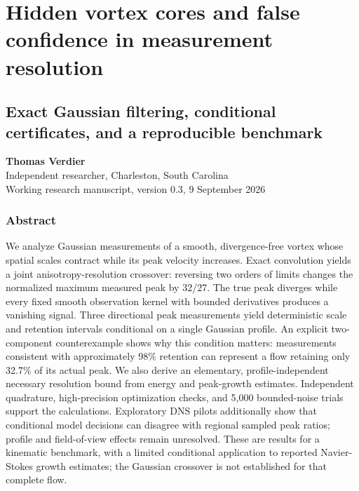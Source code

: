 \documentclass[
]{article}
\author{}
\date{}
\begin{document}
\hypertarget{hidden-vortex-cores-and-false-confidence-in-measurement-resolution}{%
\section{Hidden vortex cores and false confidence in measurement
resolution}\label{hidden-vortex-cores-and-false-confidence-in-measurement-resolution}}

\hypertarget{exact-gaussian-filtering-conditional-certificates-and-a-reproducible-benchmark}{%
\subsection{Exact Gaussian filtering, conditional certificates, and a
reproducible
benchmark}\label{exact-gaussian-filtering-conditional-certificates-and-a-reproducible-benchmark}}

\textbf{Thomas Verdier}\\
Independent researcher, Charleston, South Carolina\\
Working research manuscript, version 0.3, 9 September 2026

\hypertarget{abstract}{%
\subsubsection{Abstract}\label{abstract}}

We analyze Gaussian measurements of a smooth, divergence-free vortex
whose spatial scales contract while its peak velocity increases. Exact
convolution yields a joint anisotropy-resolution crossover: reversing
two orders of limits changes the normalized maximum measured peak by
32/27. The true peak diverges while every fixed smooth observation
kernel with bounded derivatives produces a vanishing signal. Three
directional peak measurements yield deterministic scale and retention
intervals conditional on a single Gaussian profile. An explicit
two-component counterexample shows why this condition matters:
measurements consistent with approximately 98\% retention can represent
a flow retaining only 32.7\% of its actual peak. We also derive an
elementary, profile-independent necessary resolution bound from energy
and peak-growth estimates. Independent quadrature, high-precision
optimization checks, and 5,000 bounded-noise trials support the
calculations. Exploratory DNS pilots additionally show that conditional
model decisions can disagree with regional sampled peak ratios; profile
and field-of-view effects remain unresolved. These are results for a
kinematic benchmark, with a limited conditional application to reported
Navier-Stokes growth estimates; the Gaussian crossover is not
established for that complete flow.
\end{document}
